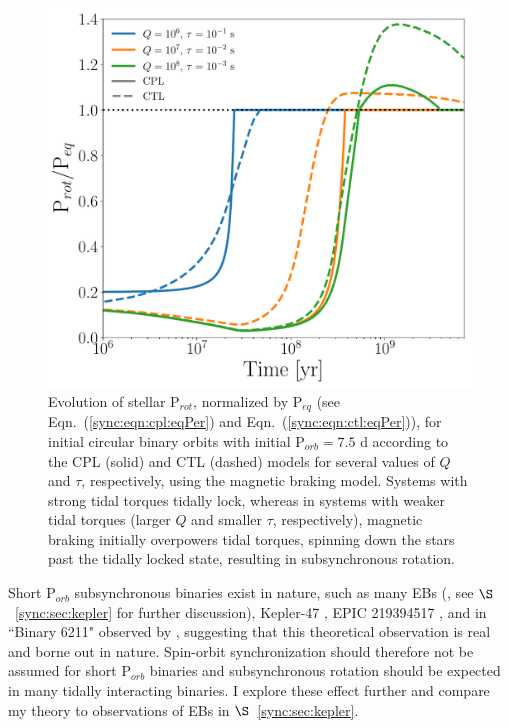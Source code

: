 \begin{figure}
	\includegraphics[width=\columnwidth]{eqPerShortPorbMatt.pdf}
   \caption{Evolution of stellar P$_{rot}$, normalized by P$_{eq}$ (see Eqn.~(\ref{sync:eqn:cpl:eqPer}) and Eqn.~(\ref{sync:eqn:ctl:eqPer})), for initial circular binary orbits with initial P$_{orb} = 7.5$ d according to the CPL (solid) and CTL (dashed) models for several values of $Q$ and $\tau$, respectively, using the \citet{Matt2015} magnetic braking model. Systems with strong tidal torques tidally lock, whereas in systems with weaker tidal torques (larger $Q$ and smaller $\tau$, respectively), magnetic braking initially overpowers tidal torques, spinning down the stars past the tidally locked state, resulting in subsynchronous rotation. }%
    \label{sync:fig:eqPerShortPorb}%
\end{figure}


Short P$_{orb}$ subsynchronous binaries exist in nature, such as many \kepler EBs (\citet{Lurie2017}, see $\S$~\ref{sync:sec:kepler} for further discussion), Kepler-47 \citep{Orosz2012}, EPIC 219394517 \citep{Torres2018}, and in ``Binary 6211" observed by \citet{Meibom2006}, suggesting that this theoretical observation is real and borne out in nature. Spin-orbit synchronization should therefore not be assumed for short P$_{orb}$ binaries and subsynchronous rotation should be expected in many tidally interacting binaries.  I explore these effect further and compare my theory to observations of \kepler EBs in $\S$~\ref{sync:sec:kepler}.

